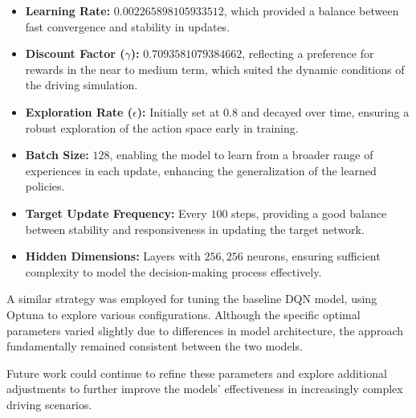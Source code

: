 \documentclass{article}
\begin{document}
\begin{itemize}
    \item \textbf{Learning Rate:} \(0.002265898105933512\), which provided a balance between fast convergence and stability in updates.
    \item \textbf{Discount Factor (\(\gamma\)):} \(0.7093581079384662\), reflecting a preference for rewards in the near to medium term, which suited the dynamic conditions of the driving simulation.
    \item \textbf{Exploration Rate (\(\epsilon\)):} Initially set at \(0.8\) and decayed over time, ensuring a robust exploration of the action space early in training.
    \item \textbf{Batch Size:} \(128\), enabling the model to learn from a broader range of experiences in each update, enhancing the generalization of the learned policies.
    \item \textbf{Target Update Frequency:} Every \(100\) steps, providing a good balance between stability and responsiveness in updating the target network.
    \item \textbf{Hidden Dimensions:} Layers with \(256, 256\) neurons, ensuring sufficient complexity to model the decision-making process effectively.
\end{itemize}

A similar strategy was employed for tuning the baseline DQN model, using Optuna to explore various configurations. Although the specific optimal parameters varied slightly due to differences in model architecture, the approach fundamentally remained consistent between the two models.

Future work could continue to refine these parameters and explore additional adjustments to further improve the models' effectiveness in increasingly complex driving scenarios.
\end{document}
